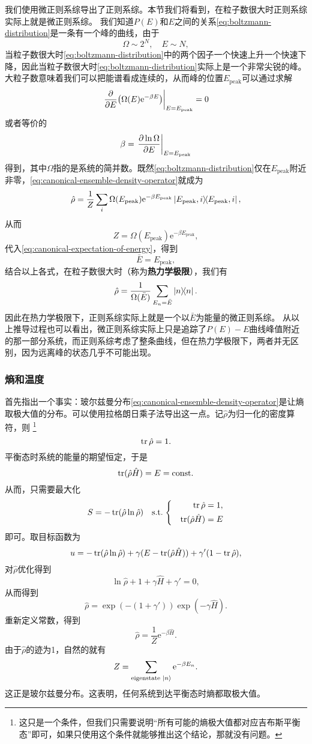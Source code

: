 \documentclass[hyperref, UTF8, a4paper]{ctexart}
\newcommand*{\ee}{\mathrm{e}}
\newcommand*{\const}{\mathrm{const}}
\newenvironment{bigcase}{\left\{\quad\begin{aligned}}{\end{aligned}\right.}
\begin{document}
我们使用微正则系综导出了正则系综。本节我们将看到，在粒子数很大时正则系综实际上就是微正则系综。
我们知道$P(E)$和$E$之间的关系\eqref{eq:boltzmann-distribution}是一条有一个峰的曲线，由于
\[
    \Omega \sim 2^N, \quad E \sim N,
\]
当粒子数很大时\eqref{eq:boltzmann-distribution}中的两个因子一个快速上升一个快速下降，因此当粒子数很大时\eqref{eq:boltzmann-distribution}实际上是一个非常尖锐的峰。
大粒子数意味着我们可以把能谱看成连续的，从而峰的位置$E_\text{peak}$可以通过求解
\[
    \eval{\pdv{E} (\Omega(E) \ee^{-\beta E})}_{E=E_\text{peak}} = 0
\]
或者等价的
\[
    \beta = \eval{\pdv{\ln \Omega}{E}}_{E=E_\text{peak}}
\]
得到，其中$\Omega$指的是系统的简并数。既然\eqref{eq:boltzmann-distribution}仅在$E_\text{peak}$附近非零，\eqref{eq:canonical-ensemble-density-operator}就成为
\[
    \hat{\rho} = \frac{1}{Z} \sum_i \Omega(E_\text{peak}) \ee^{-\beta E_\text{peak}} \dyad{E_\text{peak}, i},
\]
从而
\[
    Z = \Omega(E_\text{peak}) \ee^{-\beta E_\text{peak}},
\]
代入\eqref{eq:canonical-expectation-of-energy}，得到
\[
    \bar{E} = E_\text{peak},
\]
结合以上各式，在粒子数很大时（称为\textbf{热力学极限}），我们有
\begin{equation}
    \hat{\rho} = \frac{1}{\Omega(\bar{E})} \sum_{E_n=\bar{E}} \dyad{n}. 
\end{equation}
因此在热力学极限下，正则系综实际上就是一个以$\bar{E}$为能量的微正则系综。
从以上推导过程也可以看出，微正则系综实际上只是追踪了$P(E)-E$曲线峰值附近的那一部分系统，而正则系综考虑了整条曲线，但在热力学极限下，两者并无区别，因为远离峰的状态几乎不可能出现。

\subsubsection{熵和温度}

首先指出一个事实：玻尔兹曼分布\eqref{eq:canonical-ensemble-density-operator}是让熵取极大值的分布。可以使用拉格朗日乘子法导出这一点。记$\hat{\rho}$为归一化的密度算符，则%
\footnote{这只是一个条件，但我们只需要说明“所有可能的熵极大值都对应吉布斯平衡态”即可，如果只使用这个条件就能够推出这个结论，那就没有问题。}
\[
    \trace \hat{\rho} = 1.
\]
平衡态时系统的能量的期望恒定，于是
\[
    \trace (\hat{\rho} \hat{H}) = E = \const.
\]
从而，只需要最大化
\[
    S = - \trace (\hat{\rho} \ln \hat{\rho}) \quad \text{s.t.} \; \begin{bigcase}
        \trace \hat{\rho} &= 1, \\
        \trace (\hat{\rho} \hat{H}) &= E
    \end{bigcase}
\]
即可。取目标函数为
\[
    u = - \trace (\hat{\rho} \ln \hat{\rho}) + \gamma (E - \trace (\hat{\rho} \hat{H})) + \gamma' (1 - \trace \hat{\rho}),
\]
对$\hat{\rho}$优化得到
\[
    \ln \hat{\rho} + 1 + \gamma \hat{H} + \gamma' = 0,
\]
从而得到
\[
    \hat{\rho} = \exp (-(1+\gamma')) \exp ( - \gamma \hat{H}).
\]
重新定义常数，得到
\[
    \hat{\rho} = \frac{1}{Z} \ee^{-\beta \hat{H}}.
\]
由于$\hat{\rho}$的迹为1，自然的就有
\[
    Z = \sum_\text{eigenstate $\ket{n}$} \ee^{-\beta E_n}.
\]
这正是玻尔兹曼分布。这表明，任何系统到达平衡态时熵都取极大值。
\end{document}
